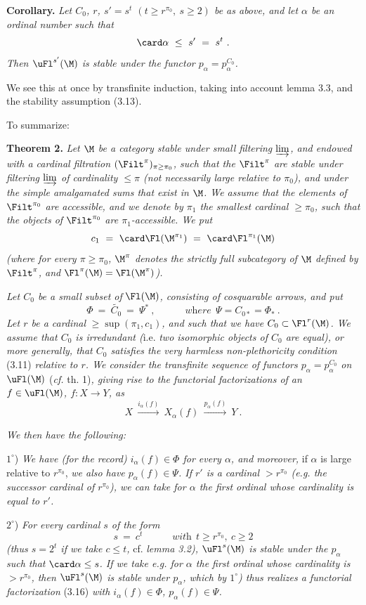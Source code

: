 \textbf{Corollary.} \textit{Let $C_0$, $r$, $s'=s^t$ $(t\geq r^{\pi_0},\ s\geq 2)$ be as above, and let $\alpha$ be an ordinal number such that}
\[
\card\alpha\ \leq\ s'\ =\ s^t\ .
\]
\textit{Then $\uFl^{s'}(\M)$ is stable under the functor $p_\alpha=p_\alpha^{C_0}$.}

We see this at once by transfinite induction, taking into account lemma 3.3, and the stability assumption (3.13).

To summarize:

\textbf{Theorem 2.} \textit{Let $\M$ be a category stable under small filtering $\varinjlim$, and endowed with a cardinal filtration} $(\Filt^\pi)_{\pi\geq\pi_0}$\textit{, such that the} $\Filt^\pi$ \textit{are stable under filtering $\varinjlim$ of cardinality $\leq\pi$ (not necessarily large relative to $\pi_0$), and under the simple amalgamated sums that exist in $\M$. We assume that the elements of} $\Filt^{\pi_0}$ \textit{are accessible, and we denote by $\pi_1$ the smallest cardinal $\geq\pi_0$, such that the objects of} $\Filt^{\pi_0}$ \textit{are $\pi_1$-accessible. We put} 
\[
c_1\ =\ \card\Fl(\M^{\pi_1})\ =\ \card\Fl^{\pi_1}(\M)
\]
\textit{(where for every $\pi\geq\pi_0$, $\M^\pi$ denotes the strictly full subcategory of $\M$ defined by} $\Filt^\pi$\textit{, and} $\Fl^\pi(\M)=\Fl(\M^\pi)$\textit{).}

\textit{Let $C_0$ be a small subset of} $\Fl(\M)$\textit{, consisting of cosquarable arrows, and put}
\[
\Phi\ =\ \widetilde{C_0}\ =\ \Psi^*\ ,\qquad\quad\textit{where}\ \ \Psi=C_{0*}=\Phi_*\ .
\]
\textit{Let $r$ be a cardinal} $\geq\sup(\pi_1,c_1)$\textit{, and such that we have $C_0\subset\Fl^r(\M)$. We assume that $C_0$ is irredundant (}i.e.\textit{ two isomorphic objects of $C_0$ are equal), or more generally, that $C_0$ satisfies the very harmless non-plethoricity condition} \textup{(3.11)} \textit{relative to $r$. We consider the transfinite sequence of functors $p_\alpha=p_\alpha^{C_0}$ on $\uFl(\M)$} \textup{(}\textit{cf.} \textup{th. 1)}\textit{, giving rise to the functorial factorizations of an $f\in\uFl(\M)$, $f:X\longrightarrow Y$, as}
\[
X\ \xrightarrow{i_\alpha(f)}\ X_\alpha(f)\ \xrightarrow{p_\alpha(f)}\ Y\ . \tag*{(3.16)}
\]

\textit{We then have the following:}

$1^\circ$) \textit{We have (for the record) $i_\alpha(f)\in\Phi$ for every $\alpha$, and moreover,} if $\alpha$ is large relative to $r^{\pi_0}$, \textit{we also have $p_\alpha(f)\in\Psi$. If $r'$ is a cardinal $>r^{\pi_0}$ (e.g. the successor cardinal of $r^{\pi_0}$), we can take for $\alpha$ the first ordinal whose cardinality is equal to $r'$.}

$2^\circ$) \textit{For every cardinal $s$ of the form}
\[
s\ =\ c^t\qquad\quad\textit{with}\ \ t\geq r^{\pi_0},\ c\geq 2
\]
\textit{(thus $s=2^t$ if we take $c\leq t$,} cf. \textit{lemma 3.2), $\uFl^s(\M)$ is stable under the $p_\alpha$ such that} $\card\alpha\leq s$\textit{. If we take e.g. for $\alpha$ the first ordinal whose cardinality is $>r^{\pi_0}$, then $\uFl^s(\M)$ is stable under $p_\alpha$, which by $1^\circ$) thus realizes a functorial factorization} \textup{(3.16)} \textit{with $i_\alpha(f)\in\Phi$, $p_\alpha(f)\in\Psi$.}